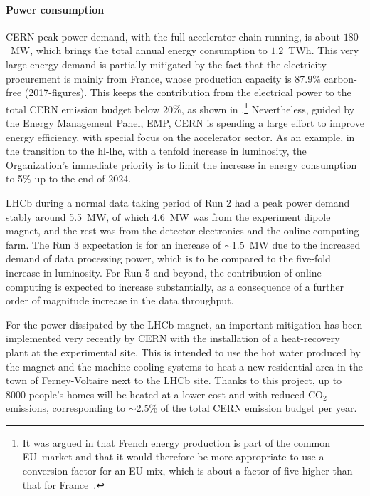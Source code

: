 \documentclass[../SustainableHEP.tex]{subfiles}
\begin{document}
\begin{casestudy}
\paragraph{Power consumption}
\label{sec:powerconsumption}
CERN peak power demand, with the full accelerator chain running, is about $180$~MW, which brings the total annual energy consumption to $1.2$~TWh. This very large energy demand is partially mitigated by the fact that the electricity procurement is mainly from France, whose production capacity is 87.9$\%$ carbon-free (2017-figures). This keeps the contribution from the electrical power to the total CERN emission budget below 20$\%$, as shown in .\footnote{It was argued in  that French energy production is part of the common EU~market and that it would therefore be more appropriate to use a conversion factor for an EU mix, which is about a factor of five higher than that for France~\cite{EUmix}.} Nevertheless, guided by the Energy Management Panel, EMP, CERN is spending a large effort to improve energy efficiency, with special focus on the accelerator sector. As an example, in the transition to the \acrshort{hl-lhc}, with a tenfold increase in luminosity, the Organization’s immediate priority is to limit the increase in energy consumption to 5$\%$ up to the end of 2024.
 
LHCb during a normal data taking period of Run 2 had a peak power demand stably around 5.5~MW, of which 4.6~MW was from the experiment dipole magnet, and the rest was from the detector electronics and the online computing farm.  The Run 3 expectation is for an increase of $\sim$1.5~MW due to the increased demand of data processing power, which is to be compared to the five-fold increase in luminosity.
For Run 5 and beyond, the contribution of online computing is expected to increase substantially, as a consequence of a further order of magnitude increase in the data throughput.

For the power dissipated by the LHCb magnet, an important mitigation has been implemented very recently by CERN with the installation of a heat-recovery plant at the experimental site. This is intended to use the
hot water produced by the magnet and the machine cooling systems to heat a new residential area in the
town of Ferney-Voltaire next to the LHCb site. Thanks to this project, up to 8000 people’s homes will be heated at a lower cost and with reduced CO$_2$ emissions, corresponding to $\sim$2.5\% of the total CERN emission budget per year. 


\end{casestudy}
\end{document}
